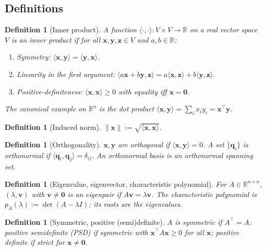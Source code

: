 \documentclass[11pt]{article}
\newtheorem{definition}[theorem]{Definition}
\theoremstyle{remark}
\begin{document}
\subsection*{Definitions}

\begin{definition}[Inner product]
A function $\langle\cdot,\cdot\rangle:V\times V\to\mathbb{R}$ on a real vector space $V$ is an \emph{inner product} if for all $\mathbf{x},\mathbf{y},\mathbf{z}\in V$ and $a,b\in\mathbb{R}$:
\begin{enumerate}
  \item Symmetry: $\langle\mathbf{x},\mathbf{y}\rangle=\langle\mathbf{y},\mathbf{x}\rangle$.
  \item Linearity in the first argument: $\langle a\mathbf{x}+b\mathbf{y},\mathbf{z}\rangle=a\langle\mathbf{x},\mathbf{z}\rangle+b\langle\mathbf{y},\mathbf{z}\rangle$.
  \item Positive-definiteness: $\langle\mathbf{x},\mathbf{x}\rangle\ge 0$ with equality iff $\mathbf{x}=\mathbf{0}$.
\end{enumerate}
The canonical example on $\mathbb{R}^n$ is the dot product $\langle\mathbf{x},\mathbf{y}\rangle=\sum_i x_i y_i=\mathbf{x}^\top\mathbf{y}$.
\end{definition}

\begin{definition}[Induced norm]
$\|\mathbf{x}\|:=\sqrt{\langle\mathbf{x},\mathbf{x}\rangle}$.
\end{definition}

\begin{definition}[Orthogonality]
$\mathbf{x},\mathbf{y}$ are \emph{orthogonal} if $\langle\mathbf{x},\mathbf{y}\rangle=0$. A set $\{\mathbf{q}_i\}$ is \emph{orthonormal} if $\langle\mathbf{q}_i,\mathbf{q}_j\rangle=\delta_{ij}$. An \emph{orthonormal basis} is an orthonormal spanning set.
\end{definition}

\begin{definition}[Eigenvalue, eigenvector, characteristic polynomial]
For $A\in\mathbb{R}^{n\times n}$, $(\lambda,\mathbf{v})$ with $\mathbf{v}\ne\mathbf{0}$ is an \emph{eigenpair} if $A\mathbf{v}=\lambda\mathbf{v}$. The \emph{characteristic polynomial} is $p_A(\lambda):=\det(A-\lambda I)$; its roots are the eigenvalues.
\end{definition}

\begin{definition}[Symmetric, positive (semi)definite]
$A$ is \emph{symmetric} if $A^\top=A$; \emph{positive semidefinite} (PSD) if symmetric with $\mathbf{x}^\top A\mathbf{x}\ge 0$ for all $\mathbf{x}$; \emph{positive definite} if strict for $\mathbf{x}\ne\mathbf{0}$.
\end{definition}
\end{document}
